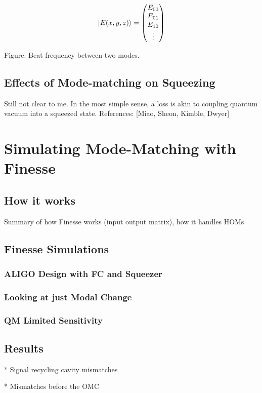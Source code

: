 \documentclass[oneside]{book}
\begin{document}
		\begin{equation}
		\ket{E(x,y,z)} = \begin{pmatrix} E_{00} \\ E_{01} \\ E_{10} \\ \vdots \end{pmatrix}
		\end{equation}

		Figure: Beat frequency between two modes.

		\section{Effects of Mode-matching on Squeezing}
		Still not clear to me.
		In the most simple sense, a loss is akin to coupling quantum vacuum into a squeezed state.
		References: [Miao, Sheon, Kimble, Dwyer]
	
	
\chapter{Simulating Mode-Matching with Finesse}	
	\section{How it works}
	Summary of how Finesse works (input output matrix), how it handles HOMs
	\cite{Saulson}
	\section{Finesse Simulations}
		\subsection{ALIGO Design with FC and Squeezer}
		\subsection{Looking at just Modal Change}
		\subsection{QM Limited Sensitivity}
			
	\section{Results}
		* Signal recycling cavity mismatches

		* Mismatches before the OMC
			
\end{document}
